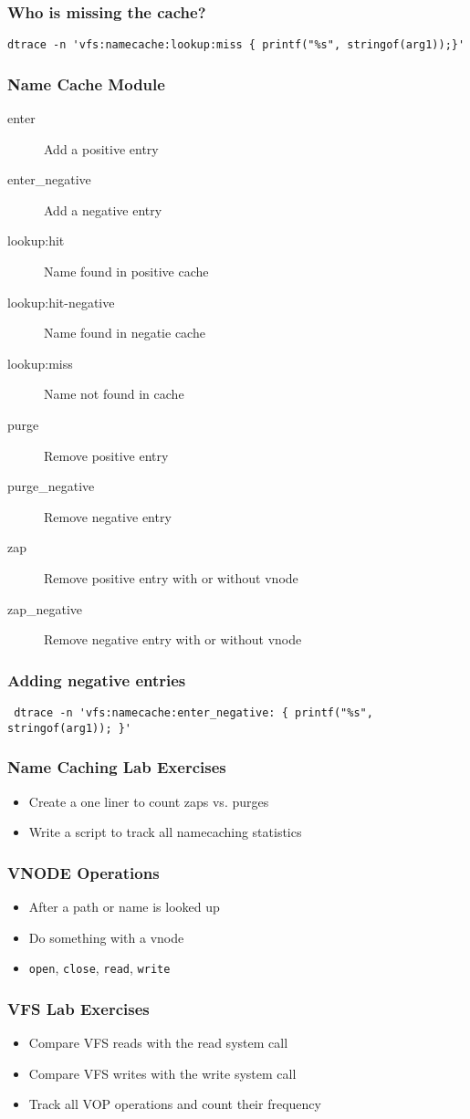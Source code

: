 \documentclass[pdftex]{beamer}
\begin{document}
\begin{frame}[fragile]
  \frametitle{Who is missing the cache?}
\begin{verbatim}
dtrace -n 'vfs:namecache:lookup:miss { printf("%s", stringof(arg1));}'
\end{verbatim}
\end{frame}

\begin{frame}[fragile]
  \frametitle{Name Cache Module}
  \begin{description}
  \item[enter] Add a positive entry
  \item[enter\_negative] Add a negative entry
  \item[lookup:hit] Name found in positive cache
  \item[lookup:hit-negative] Name found in negatie cache
  \item[lookup:miss] Name not found in cache
  \item[purge] Remove positive entry
  \item[purge\_negative] Remove negative entry
  \item[zap] Remove positive entry with or without vnode
  \item[zap\_negative] Remove negative entry with or without vnode
  \end{description}
\end{frame}

\begin{frame}[fragile]
  \frametitle{Adding negative entries}
\begin{verbatim}
 dtrace -n 'vfs:namecache:enter_negative: { printf("%s", stringof(arg1)); }'
\end{verbatim}
\end{frame}

\begin{frame}
  \frametitle{Name Caching Lab Exercises}
  \begin{itemize}
  \item Create a one liner to count zaps vs. purges
  \item Write a script to track all namecaching statistics
  \end{itemize}
\end{frame}

\begin{frame}[fragile]
  \frametitle{VNODE Operations}
  \begin{itemize}
  \item After a path or name is looked up
  \item Do something with a vnode
  \item \verb|open|, \verb|close|, \verb|read|, \verb|write|
  \end{itemize}
\end{frame}

\begin{frame}
  \frametitle{VFS Lab Exercises}
  \begin{itemize}
  \item Compare VFS reads with the read system call
  \item Compare VFS writes with the write system call
  \item Track all VOP operations and count their frequency
  \end{itemize}
\end{frame}
\end{document}
